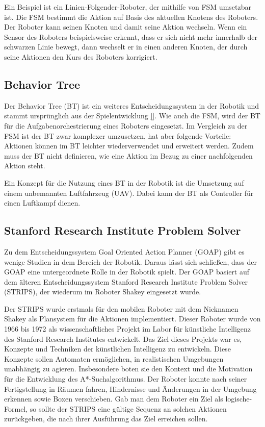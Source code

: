 Ein Beispiel ist ein Linien-Folgender-Roboter, der mithilfe von FSM umsetzbar ist. Die FSM bestimmt die Aktion auf Basis des aktuellen Knotens des Roboters. Der Roboter kann seinen Knoten und damit seine Aktion wechseln. Wenn ein Sensor des Roboters beispielsweise erkennt, dass er sich nicht mehr innerhalb der schwarzen Linie bewegt, dann wechselt er in einen anderen Knoten, der durch seine Aktionen den Kurs des Roboters korrigiert.

\subsection{Behavior Tree}
\label{chap:bt robotik}

Der Behavior Tree (BT) ist ein weiteres Entscheidungssystem in der Robotik und stammt urspr\"{u}nglich aus der Spielentwicklung \ref{}. Wie auch die FSM, wird der BT f\"{u}r die Aufgabenorchestrierung eines Roboters eingesetzt. Im Vergleich zu der FSM ist der BT zwar komplexer umzusetzen, hat aber folgende Vorteile: Aktionen k\"{o}nnen im BT leichter wiederverwendet und erweitert werden. Zudem muss der BT nicht definieren, wie eine Aktion im Bezug zu einer nachfolgenden Aktion steht.

Ein Konzept f\"{u}r die Nutzung eines BT in der Robotik ist die Umsetzung auf einem unbemannten Luftfahrzeug (UAV). Dabei kann der BT als Controller f\"{u}r einen Luftkampf dienen.

\subsection{Stanford Research Institute Problem Solver}
\label{chap:strips}

Zu dem Entscheidungssystem Goal Oriented Action Planner (GOAP) gibt es wenige Studien in dem Bereich der Robotik. Daraus l\"{a}sst sich schlie\ss{}en, dass der GOAP eine untergeordnete Rolle in der Robotik spielt. Der GOAP basiert auf dem \"{a}lteren Entscheidungssystem Stanford Research Institute Problem Solver (STRIPS), der wiederum im Roboter Shakey eingesetzt wurde.

Der STRIPS wurde erstmals f\"{u}r den mobilen Roboter mit dem Nicknamen Shakey als Plansystem f\"{u}r die Aktionen implementiert. Dieser Roboter wurde von 1966 bis 1972 als wissenschaftliches Projekt im Labor f\"{u}r k\"{u}nstliche Intelligenz des Stanford Research Institutes entwickelt. Das Ziel dieses Projekts war es, Konzepte und Techniken der k\"{u}nstlichen Intelligenz zu entwickeln. Diese Konzepte sollen Automaten erm\"{o}glichen, in realistischen Umgebungen unabh\"{a}ngig zu agieren. Insbesondere boten sie den Kontext und die Motivation f\"{u}r die Entwicklung des A*-Suchalgorithmus\autocite{}. Der Roboter konnte nach seiner Fertigstellung in R\"{a}umen fahren, Hindernisse und \"{A}nderungen in der Umgebung erkennen sowie Boxen verschieben. Gab man dem Roboter ein Ziel als logische-Formel, so sollte der STRIPS eine g\"{u}ltige Sequenz an solchen Aktionen zur\"{u}ckgeben, die nach ihrer Ausf\"{u}hrung das Ziel erreichen sollen.

